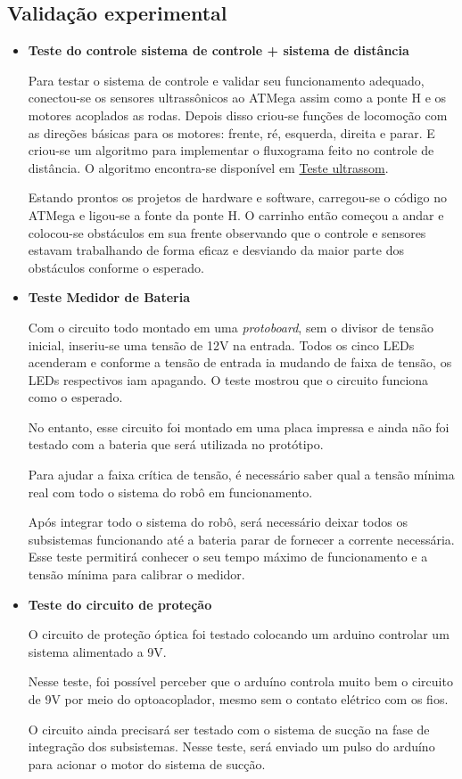 \subsection{Validação experimental} %
	\label{sub:validação_experimental}
	\begin{itemize}
		\item \textbf{Teste do controle sistema de controle + sistema de distância}

			Para testar o sistema de controle e validar seu funcionamento adequado, conectou-se os sensores ultrassônicos ao ATMega assim como a ponte H e os motores acoplados as rodas. Depois disso criou-se funções de locomoção com as direções básicas para os motores: frente, ré, esquerda, direita e parar. E criou-se um algoritmo para implementar o fluxograma feito no controle de distância. O algoritmo encontra-se disponível em \href{https://github.com/kaiocoelho/CodigoESP/blob/master/codigo_teste/Teste_ultrassom.ino}{Teste ultrassom}.

			Estando prontos os projetos de hardware e software, carregou-se o código no ATMega e ligou-se a fonte da ponte H. O carrinho então começou a andar e colocou-se obstáculos em sua frente observando que o controle e sensores estavam trabalhando de forma eficaz e desviando da maior parte dos obstáculos conforme o esperado.

		\item \textbf{Teste Medidor de Bateria}

			Com o circuito todo montado em uma \textit{protoboard}, sem o divisor de tensão inicial, inseriu-se uma tensão de 12V na entrada. Todos os cinco LEDs acenderam e conforme a tensão de entrada ia mudando de faixa de tensão, os LEDs respectivos iam apagando. O teste mostrou que o circuito funciona como o esperado.

			No entanto, esse circuito foi montado em uma placa impressa e ainda não foi testado com a bateria que será utilizada no protótipo.

			Para ajudar a faixa crítica de tensão, é necessário saber qual a tensão mínima real com todo o sistema do robô em funcionamento.

			Após integrar todo o sistema do robô, será necessário deixar todos os subsistemas funcionando até a bateria parar de fornecer a corrente necessária. Esse teste permitirá conhecer o seu tempo máximo de funcionamento e a tensão mínima para calibrar o medidor.

		\item \textbf{Teste do circuito de proteção}

			O circuito de proteção óptica foi testado colocando um arduino controlar um sistema alimentado a 9V.

			Nesse teste, foi possível perceber que o arduíno controla muito bem o circuito de 9V por meio do optoacoplador, mesmo sem o contato elétrico com os fios.

			O circuito ainda precisará ser testado com o sistema de sucção na fase de integração dos subsistemas. Nesse teste, será enviado um pulso do arduíno para acionar o motor do sistema de sucção.
	\end{itemize}


